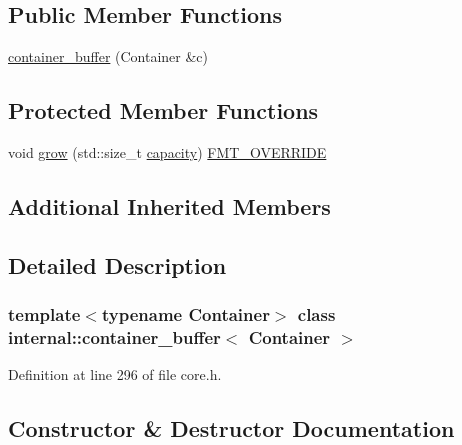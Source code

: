 \subsection*{Public Member Functions}
\begin{DoxyCompactItemize}
\item 
\hyperlink{classinternal_1_1container__buffer_a20f1b1924bb4bf09e5530fc3132b7628}{container\+\_\+buffer} (Container \&c)
\end{DoxyCompactItemize}
\subsection*{Protected Member Functions}
\begin{DoxyCompactItemize}
\item 
void \hyperlink{classinternal_1_1container__buffer_a9dc9c633e12053ddf07af13b30b378b3}{grow} (std\+::size\+\_\+t \hyperlink{classinternal_1_1basic__buffer_ae88bfc1cb8c896fa0b689ad8158cccae}{capacity}) \hyperlink{core_8h_a023c6c178e254d81d578b90921804b1c}{F\+M\+T\+\_\+\+O\+V\+E\+R\+R\+I\+DE}
\end{DoxyCompactItemize}
\subsection*{Additional Inherited Members}


\subsection{Detailed Description}
\subsubsection*{template$<$typename Container$>$\newline
class internal\+::container\+\_\+buffer$<$ Container $>$}



Definition at line 296 of file core.\+h.



\subsection{Constructor \& Destructor Documentation}
\mbox{\label{classinternal_1_1container__buffer_a20f1b1924bb4bf09e5530fc3132b7628}} 
